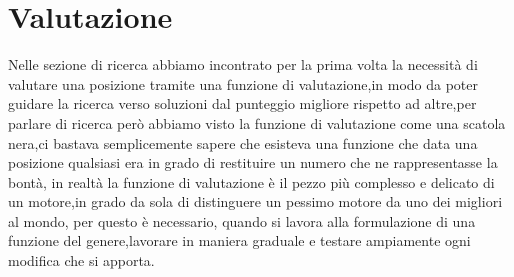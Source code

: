 \section{Valutazione}
Nelle sezione di ricerca abbiamo incontrato per la prima volta la necessità di valutare una posizione tramite una funzione di valutazione,in modo da poter guidare la ricerca verso soluzioni dal punteggio 
migliore rispetto ad altre,per parlare di ricerca però abbiamo visto la funzione di valutazione come una scatola nera,ci bastava semplicemente sapere che esisteva una funzione che data una posizione qualsiasi 
era in grado di restituire un numero che ne rappresentasse la bontà, in realtà la funzione di valutazione è il pezzo più complesso e delicato di un motore,in grado da sola di distinguere un pessimo motore
da uno dei migliori al mondo, per questo è necessario, quando si lavora alla formulazione di una funzione del genere,lavorare in maniera graduale e testare ampiamente ogni modifica che si apporta.

